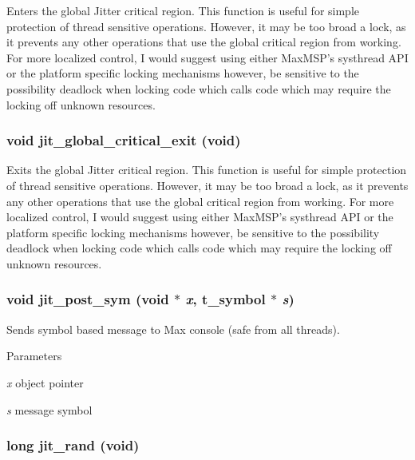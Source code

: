 Enters the global Jitter critical region. This function is useful for simple protection of thread sensitive operations. However, it may be too broad a lock, as it prevents any other operations that use the global critical region from working. For more localized control, I would suggest using either MaxMSP's systhread API or the platform specific locking mechanisms however, be sensitive to the possibility deadlock when locking code which calls code which may require the locking off unknown resources. \hypertarget{group__utilitymod_gaed36b7cd30e3ac8859cf8808c199b6de}{
\subsubsection[{jit\_\-global\_\-critical\_\-exit}]{\setlength{\rightskip}{0pt plus 5cm}void jit\_\-global\_\-critical\_\-exit (void)}}
\label{group__utilitymod_gaed36b7cd30e3ac8859cf8808c199b6de}


Exits the global Jitter critical region. This function is useful for simple protection of thread sensitive operations. However, it may be too broad a lock, as it prevents any other operations that use the global critical region from working. For more localized control, I would suggest using either MaxMSP's systhread API or the platform specific locking mechanisms however, be sensitive to the possibility deadlock when locking code which calls code which may require the locking off unknown resources. \hypertarget{group__utilitymod_ga3b56c14bcf54b8cdc384e8cc95b09c38}{
\subsubsection[{jit\_\-post\_\-sym}]{\setlength{\rightskip}{0pt plus 5cm}void jit\_\-post\_\-sym (void $\ast$ {\em x}, \/  {\bf t\_\-symbol} $\ast$ {\em s})}}
\label{group__utilitymod_ga3b56c14bcf54b8cdc384e8cc95b09c38}


Sends symbol based message to Max console (safe from all threads). 
\begin{DoxyParams}{Parameters}
\item[{\em x}]object pointer \item[{\em s}]message symbol \end{DoxyParams}
\hypertarget{group__utilitymod_ga5308a31718feaa1735e673fc59f64fd0}{
\subsubsection[{jit\_\-rand}]{\setlength{\rightskip}{0pt plus 5cm}long jit\_\-rand (void)}}
\label{group__utilitymod_ga5308a31718feaa1735e673fc59f64fd0}


